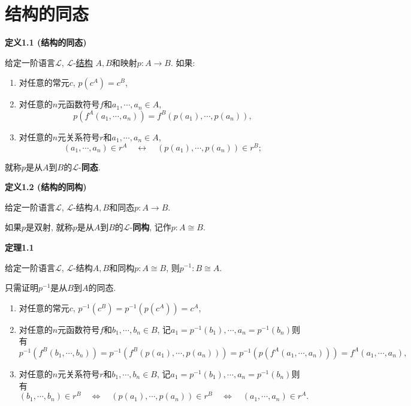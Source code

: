 \documentclass[UTF8]{ctexart}
\begin{document}
\setlength{\abovedisplayskip}{1pt}
\setlength{\belowdisplayskip}{1pt}

\section{结构的同态}

\hypertarget{sec:定义1.1}{}
\noindent\textbf{定义1.1 (结构的同态)}

给定一阶语言$\mathcal{L}$,
$\mathcal{L}$-\href{01 一阶语言的结构#nameddest=sec:定义1.1}{结构}
$A,B$和映射$p:A\to B$. 如果:
\begin{enumerate}
    \item 对任意的常元$c$, $p(c^A)=c^B$,
    \item 对任意的$n$元函数符号$f$和$a_1,\cdots,a_n\in A$,
    \[
        p(f^A(a_1,\cdots,a_n))=f^B(p(a_1),\cdots,p(a_n)),
    \]
    \item 对任意的$n$元关系符号$r$和$a_1,\cdots,a_n\in A$,
    \[
        (a_1,\cdots,a_n)\in r^A\quad\leftrightarrow\quad
        (p(a_1),\cdots,p(a_n))\in r^B;
    \]
\end{enumerate}
就称$p$是从$A$到$B$的$\mathcal{L}$-\textbf{同态}.

\vspace{10pt}

\hypertarget{sec:定义1.2}{}
\noindent\textbf{定义1.2 (结构的同构)}

给定一阶语言$\mathcal{L}$, $\mathcal{L}$-结构$A,B$和同态$p:A\to B$.

如果$p$是双射, 就称$p$是从$A$到$B$的$\mathcal{L}$-\textbf{同构}, 记作$p:A\cong B$.

\vspace{10pt}

\hypertarget{sec:定理1.1}{}
\noindent\textbf{定理1.1}

给定一阶语言$\mathcal{L}$, $\mathcal{L}$-结构$A,B$和同构$p:A\cong B$,
则$p^{-1}:B\cong A$.


只需证明$p^{-1}$是从$B$到$A$的同态.

\begin{enumerate}
    \item 对任意的常元$c$, $p^{-1}(c^B)=p^{-1}(p(c^A))=c^A$,
    \item 对任意的$n$元函数符号$f$和$b_1,\cdots,b_n\in B$,
    记$a_1=p^{-1}(b_1),\cdots,a_n=p^{-1}(b_n)$则有
    \[
        p^{-1}(f^B(b_1,\cdots,b_n))=p^{-1}(f^B(p(a_1),\cdots,p(a_n)))
        =p^{-1}(p(f^A(a_1,\cdots,a_n)))=f^A(a_1,\cdots,a_n),
    \]
    \item 对任意的$n$元关系符号$r$和$b_1,\cdots,b_n\in B$,
    记$a_1=p^{-1}(b_1),\cdots,a_n=p^{-1}(b_n)$则有
    \begin{equation*}
        (b_1,\cdots,b_n)\in r^B\quad\iff\quad
        (p(a_1),\cdots,p(a_n))\in r^B\quad\iff\quad
        (a_1,\cdots,a_n)\in r^A.
    \tag*{\qedsymbol}\end{equation*}
\end{enumerate}
\end{document}
